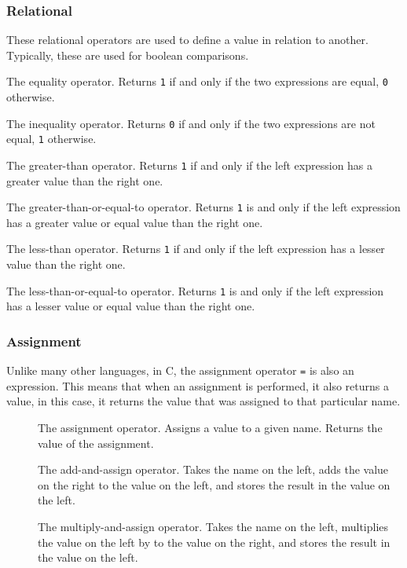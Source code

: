\subsubsection{Relational}\label{subsubsec:Relational_Operators}
These relational operators are used to define a value in relation to another.
Typically, these are used for boolean comparisons.

\begin{description}[noitemsep]
\item[\cinline{==}] The equality operator.
  Returns \texttt{1} if and only if the two expressions are equal, \texttt{0} otherwise.

\item[\cinline{!=}] The inequality operator.
  Returns \texttt{0} if and only if the two expressions are not equal, \texttt{1} otherwise.

\item[\cinline{>}] The greater-than operator.
  Returns \texttt{1} if and only if the left expression has a greater value than the right one.

\item[\cinline{>=}] The greater-than-or-equal-to operator.
  Returns \texttt{1} is and only if the left expression has a greater value or equal value than the right one.

\item[\cinline{<}] The less-than operator.
  Returns \texttt{1} if and only if the left expression has a lesser value than the right one.

\item[\cinline{<=}] The less-than-or-equal-to operator.
  Returns \texttt{1} is and only if the left expression has a lesser value or equal value than the right one.
\end{description}

\subsubsection{Assignment}\label{subsubsec:Assignment_Operators}
Unlike many other languages, in C, the assignment operator \texttt{=} is also an expression.
This means that when an assignment is performed, it also returns a value, in this case, it returns the value that was assigned to that particular name.

\begin{description}
\item[\cinline{=}] The assignment operator.
  Assigns a value to a given name.
  Returns the value of the assignment.

\item[\cinline{+=}] The add-and-assign operator.
  Takes the name on the left, adds the value on the right to the value on the left, and stores the result in the value on the left.

\item[\cinline{*=}] The multiply-and-assign operator.
  Takes the name on the left, multiplies the value on the left by to the value on the right, and stores the result in the value on the left.
\end{description}

